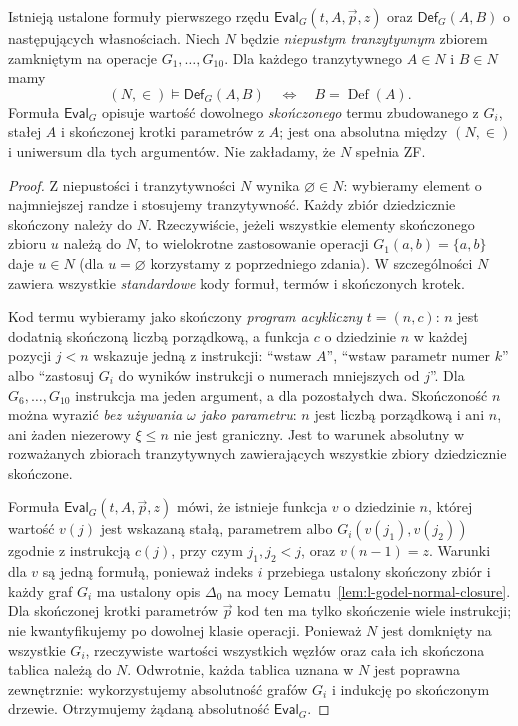 \begin{lemat}
\label{lem:l-finite-godel-term-absoluteness-78}
Istnieją ustalone formuły pierwszego rzędu
$\mathsf{Eval}_G(t,A,\vec p,z)$ oraz
$\mathsf{Def}_G(A,B)$ o następujących własnościach.
Niech $N$ będzie \emph{niepustym tranzytywnym} zbiorem
zamkniętym na operacje $G_1,\ldots,G_{10}$.
Dla każdego tranzytywnego $A\in N$ i $B\in N$ mamy
\[
 (N,\in)\models\mathsf{Def}_G(A,B)
 \quad\Longleftrightarrow\quad B=\operatorname{Def}(A).
\]
Formuła $\mathsf{Eval}_G$ opisuje wartość dowolnego
\emph{skończonego} termu zbudowanego z $G_i$, stałej
$A$ i skończonej krotki parametrów z $A$; jest ona
absolutna między $(N,\in)$ i uniwersum dla tych
argumentów. Nie zakładamy, że $N$ spełnia ZF.
\end{lemat}
\begin{proof}
Z niepustości i tranzytywności $N$ wynika
$\varnothing\in N$: wybieramy element o najmniejszej
randze i stosujemy tranzytywność. Każdy zbiór
dziedzicznie skończony należy do $N$. Rzeczywiście,
jeżeli wszystkie elementy skończonego zbioru $u$
należą do $N$, to wielokrotne zastosowanie operacji
$G_1(a,b)=\{a,b\}$ daje $u\in N$ (dla $u=\varnothing$
korzystamy z poprzedniego zdania). W szczególności
$N$ zawiera wszystkie \emph{standardowe} kody formuł,
termów i skończonych krotek.

Kod termu wybieramy jako skończony \emph{program acykliczny}
$t=(n,c)$: $n$ jest dodatnią skończoną liczbą
porządkową, a funkcja $c$ o dziedzinie $n$
w każdej pozycji $j<n$ wskazuje jedną z instrukcji:
``wstaw $A$'', ``wstaw parametr numer $k$''
albo ``zastosuj $G_i$ do wyników instrukcji
o numerach mniejszych od $j$''.
Dla $G_6,\ldots,G_{10}$ instrukcja ma jeden
argument, a dla pozostałych dwa. Skończoność
$n$ można wyrazić \emph{bez używania $\omega$ jako
parametru}: $n$ jest liczbą porządkową i ani $n$,
ani żaden niezerowy $\xi\le n$ nie jest graniczny.
Jest to warunek absolutny w rozważanych zbiorach
tranzytywnych zawierających wszystkie zbiory
dziedzicznie skończone.

Formuła $\mathsf{Eval}_G(t,A,\vec p,z)$ mówi, że
istnieje funkcja $v$ o dziedzinie $n$, której wartość
$v(j)$ jest wskazaną stałą, parametrem albo
$G_i(v(j_1),v(j_2))$ zgodnie z instrukcją $c(j)$,
przy czym $j_1,j_2<j$, oraz $v(n-1)=z$.
Warunki dla $v$ są jedną formułą, ponieważ indeks
$i$ przebiega ustalony skończony zbiór i każdy
graf $G_i$ ma ustalony opis $\Delta_0$ na mocy
Lematu~\ref{lem:l-godel-normal-closure}.
Dla skończonej krotki parametrów $\vec p$
kod ten ma tylko skończenie wiele instrukcji;
nie kwantyfikujemy po dowolnej klasie operacji.
Ponieważ $N$ jest domknięty na wszystkie
$G_i$, rzeczywiste wartości wszystkich węzłów oraz
cała ich skończona tablica należą do $N$. Odwrotnie,
każda tablica uznana w $N$ jest poprawna zewnętrznie:
wykorzystujemy absolutność grafów $G_i$ i indukcję
po skończonym drzewie. Otrzymujemy żądaną
absolutność $\mathsf{Eval}_G$.


\end{proof}
